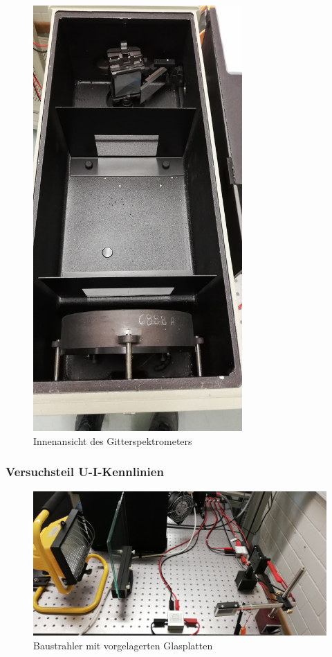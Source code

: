 \begin{figure}[h]
    \centering
    \includegraphics[width = 8cm]{Bilder/Aufbau4.jpg}
    \caption{Innenansicht des Gitterspektrometers}
\end{figure}
\clearpage


\subsubsection{Versuchsteil U-I-Kennlinien}

\begin{figure}[h]
    \centering
    \includegraphics[width = \linewidth]{Bilder/Aufbau1.jpg}
    \caption{Baustrahler mit vorgelagerten Glasplatten}
\end{figure}


